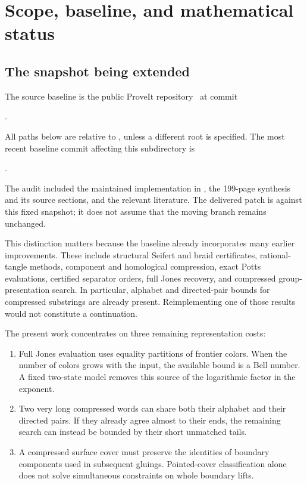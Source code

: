\section{Scope, baseline, and mathematical status}
\label{sec:overview}

\subsection{The snapshot being extended}

The source baseline is the public ProveIt repository~\cite{proveit-baseline} at commit
\begin{center}\small
{}.
\end{center}
All paths below are relative to , unless a
different root is specified. The most recent baseline commit affecting this
subdirectory is
\begin{center}\small
{}.
\end{center}
The audit included the maintained implementation in , the
199-page synthesis and its source sections, and the relevant literature.
The delivered patch is against this fixed snapshot; it does not assume that
the moving  branch remains unchanged.

This distinction matters because the baseline already incorporates many
earlier improvements. These include structural Seifert and braid
certificates, rational-tangle methods, component and homological compression,
exact Potts evaluations, certified separator orders, full Jones recovery,
and compressed group-presentation search. In particular, alphabet and
directed-pair bounds for compressed substrings are already present.
Reimplementing one of those results would not constitute a continuation.

The present work concentrates on three remaining representation costs:

\begin{enumerate}
\item Full Jones evaluation uses equality partitions of frontier colors.
When the number of colors grows with the input, the available bound is a
Bell number. A fixed two-state model removes this source of the logarithmic
factor in the exponent.
\item Two very long compressed words can share both their alphabet and
their directed pairs. If they already agree almost to their ends, the
remaining search can instead be bounded by their short unmatched tails.
\item A compressed surface cover must preserve the identities of boundary
components used in subsequent gluings. Pointed-cover classification alone
does not solve simultaneous constraints on whole boundary lifts.
\end{enumerate}

